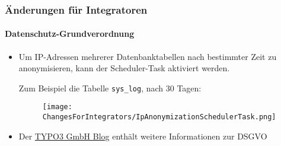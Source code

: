 
\begin{frame}[fragile]
	\frametitle{Änderungen für Integratoren}
	\framesubtitle{Datenschutz-Grundverordnung}

	\begin{itemize}
		\item  Um IP-Adressen mehrerer Datenbanktabellen nach bestimmter Zeit zu anonymisieren,
			kann der Scheduler-Task aktiviert werden.\newline

			Zum Beispiel die Tabelle \texttt{sys\_log}, nach 30 Tagen:
			\begin{figure}
				\texttt{[image: ChangesForIntegrators/IpAnonymizationSchedulerTask.png]}
			\end{figure}

		\item Der \href{https://typo3.com/blog/tag/gdpr/}{TYPO3 GmbH Blog}
			enthält weitere Informationen zur DSGVO
	\end{itemize}

\end{frame}


